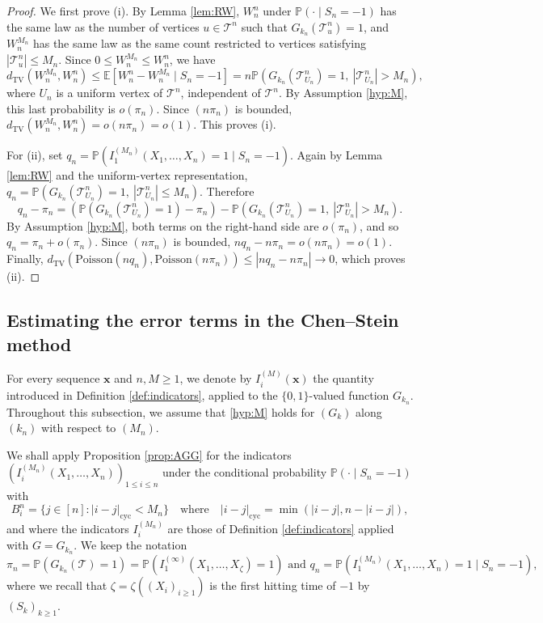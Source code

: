 \documentclass[a4paper,11pt]{article}
\newcommand{\E}{\mathbb{E}}
\DeclareRobustCommand{\P}{\mathbb{P}}
\DeclareRobustCommand{\1}{\mathbf{1}}
\newcommand{\dTV}{d_{\mathrm{TV}}}
\newcommand{\Po}{\mathrm{Poisson}}
\begin{document}
  
\begin{proof}
We first prove \textup{(i)}. By Lemma \ref{lem:RW}, $W_n^n$ under $\P(\cdot\mid S_n=-1)$ has the same law as the number of vertices $u\in\mathcal T^n$ such that $G_{k_n}(\mathcal T^n_u)=1$, and $W_n^{M_n}$ has the same law as the same count restricted to vertices satisfying $|\mathcal T^n_u|\le M_n$. Since $0\le W_n^{M_n}\le W_n^n$, we have
$$\dTV(W_n^{M_n},W_n^n)\le\E[W_n^n-W_n^{M_n}\mid S_n=-1]=n\P(G_{k_n}(\mathcal T^n_{U_n})=1,\ |\mathcal T^n_{U_n}|>M_n),$$ where $U_n$ is a uniform vertex of $\mathcal T^n$, independent of $\mathcal T^n$. By Assumption \ref{hyp:M}, this last probability is $o(\pi_n)$. Since $(n\pi_n)$ is bounded, $\dTV(W_n^{M_n},W_n^n)=o(n\pi_n)=o(1)$. This proves \textup{(i)}.

For \textup{(ii)}, set $q_n=\P(I_1^{(M_n)}(X_1,\ldots,X_n)=1\mid S_n=-1)$. Again by Lemma \ref{lem:RW} and the uniform-vertex representation, $q_n=\P(G_{k_n}(\mathcal T^n_{U_n})=1,\ |\mathcal T^n_{U_n}|\le M_n)$. Therefore $$q_n-\pi_n=(\P(G_{k_n}(\mathcal T^n_{U_n})=1)-\pi_n)-\P(G_{k_n}(\mathcal T^n_{U_n})=1,\ |\mathcal T^n_{U_n}|>M_n).$$ By Assumption \ref{hyp:M}, both terms on the right-hand side are $o(\pi_n)$, and so $q_n=\pi_n+o(\pi_n)$. Since $(n\pi_n)$ is bounded, $nq_n-n\pi_n=o(n\pi_n)=o(1)$. Finally, $\dTV(\Po(nq_n),\Po(n\pi_n))\le |nq_n-n\pi_n|\to0$, which proves \textup{(ii)}.
\end{proof}

\subsection{Estimating the error terms in the Chen--Stein method}
\label{ssec:error}

For every sequence $\mathbf{x}$ and $n,M\ge1$, we denote by $I_i^{(M)}(\mathbf{x})$ the quantity introduced in Definition \ref{def:indicators}, applied to the $\{0,1\}$-valued function $G_{k_n}$. Throughout this subsection, we assume that \ref{hyp:M} holds for $(G_k)$ along $(k_n)$ with respect to $(M_n)$.


We shall apply Proposition \ref{prop:AGG} for the indicators $(I^{(M_{n})}_{i}(X_{1}, \ldots,X_{n}))_{1 \leq i \leq  n}$ under the conditional probability $\P(\cdot \mid S_{n}=-1)$ with
$$B_i^n=\{j\in[n]: |i-j|_{\mathrm{cyc}}<M_n\} \quad \textrm{where} \quad |i-j|_{\mathrm{cyc}}=\min(|i-j|,n-|i-j|),
$$
  and where the indicators $I_i^{(M_{n})}$ are those of Definition
\ref{def:indicators} applied with $G=G_{k_n}$.
We keep the notation 
\begin{equation}
\label{eq:defpi}
\pi_{n}=\P(G_{k_{n}}( \mathcal{T})=1)=\P(I^{(\infty)}_{1}(X_{1}, \ldots,X_{\zeta})=1)
\textrm{ and }  q_{n}=\P(I^{(M_{n})}_{1}(X_{1}, \ldots,X_{n})=1 \mid S_{n}=-1),
\end{equation}
where we recall that $\zeta=\zeta((X_{i})_{i \geq 1})$ is  the first hitting time of $-1$ by $(S_{k})_{k \geq 1}$.
\end{document}
